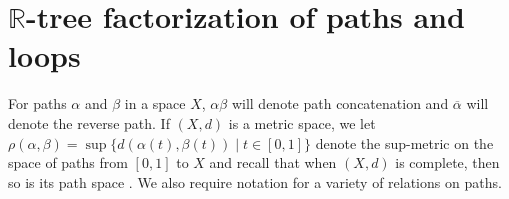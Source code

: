 \documentclass[12pt, leqno]{amsart}
\newcommand{\ui}{[0,1]}
\newcommand{\wt}{\widetilde}
\newcommand{\bbd}{\mathbb{D}}
\newcommand{\bbr}{\mathbb{R}}
\newcommand{\ov}{\overline}
\newtheorem{corollary}[theorem]{Corollary}
\theoremstyle{definition}\newtheorem{definition}[theorem]{Definition}
\begin{document}









\section{$\bbr$-tree factorization of paths and loops}\label{sec: equivalences}

For paths $\alpha$ and $\beta$ in a space $X$, $\alpha\beta$ will denote path concatenation and $\ov{\alpha}$ will denote the reverse path. If $(X,d)$ is a metric space, we let $\rho(\alpha,\beta)=\sup\{d(\alpha(t),\beta(t))\mid t\in\ui\}$ denote the sup-metric on the space of paths from $\ui$ to $X$ and recall that when $(X,d)$ is complete, then so is its path space \cite[4.3.13]{Engelking}. We also require notation for a variety of relations on paths.
\end{document}
